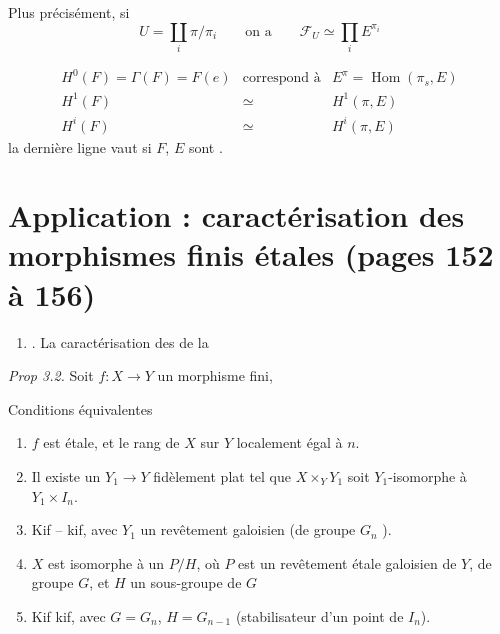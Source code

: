 \documentclass[11pt,a4paper]{article}
\begin{document}
Plus précisément, si
\[
U = \coprod_i \pi/\pi_i \qquad \text{on a} \qquad \mathcal{F}_U \simeq \prod_i E^{\pi_i}
\]

\[
\begin{array}{lll}
H^0(F) = \Gamma(F) = F(e) & \text{correspond à} & E^{\pi} = \operatorname{Hom}(\pi_s, E) \\
H^1(F) & \simeq & H^1(\pi, E) \\
H^i(F) & \simeq & H^i(\pi, E)
\end{array}
\]
la dernière ligne vaut si $F$, $E$ sont .

\section*{Application : caractérisation des morphismes finis étales (pages 152 à 156)}


\begin{enumerate}
\item[3.] . La caractérisation des \struck{\ill{}}
 de la \ill{} \struck{\ill{}} \ill{}
\end{enumerate}


\emph{Prop 3.2.} Soit $f : X \to Y$ un morphisme fini, \ill{}

Conditions équivalentes
\begin{enumerate}
\item[(i)] $f$ est étale, et le rang de $X$ \ill{} \ill{} sur $Y$ \ill{}
localement égal à $n$.
\item[(ii)] Il existe un $Y_1 \to Y$ fidèlement plat tel que
$X \times_Y Y_1$ soit $Y_1$-isomorphe à $Y_1 \times I_n$.
\item[(ii bis)] Kif -- kif, avec $Y_1$ \struck{\ill{}} un revêtement
galoisien (de groupe $G_n$ ).
\item[(iii)] $X$ est isomorphe à un $P$\struck{\ill{}}$/H$, où $P$ est un
revêtement étale galoisien de $Y$, de groupe $G$, et $H$ un sous-groupe de $G$
\item[(iii bis)] Kif kif, avec $G = G_n$, $H = G_{n-1}$
(stabilisateur d'un point de $I_n$).
\end{enumerate}

\end{document}
